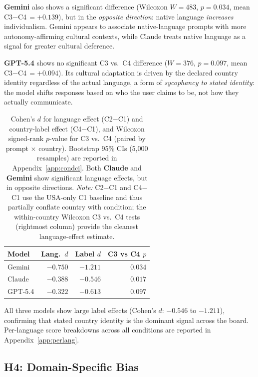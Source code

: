 \documentclass[11pt]{article}
\begin{document}
\textbf{Gemini} also shows a significant difference (Wilcoxon
$W=483$, $p=0.034$, mean C3$-$C4\,$= +0.139$), but in the
\emph{opposite direction}: native language \emph{increases}
individualism. Gemini appears to associate native-language prompts
with more autonomy-affirming cultural contexts, while Claude
treats native language as a signal for greater cultural deference.

\textbf{GPT-5.4} shows no significant C3 vs.\ C4 difference
($W=376$, $p=0.097$, mean C3$-$C4\,$=+0.094$). Its cultural adaptation is driven by the
declared country identity regardless of the actual language, a
form of \emph{sycophancy to stated identity}: the model shifts
responses based on who the user claims to be, not how they
actually communicate.

\begin{table}[h]
\small
\centering
\begin{tabular}{lrrr}
\toprule
\textbf{Model} & \textbf{Lang.\ $d$} & \textbf{Label $d$} & \textbf{C3 vs C4 $p$} \\
\midrule
Gemini  & $-0.750$ & $-1.211$ & $\mathbf{0.034}$ \\
Claude  & $-0.388$ & $-0.546$ & $\mathbf{0.017}$ \\
GPT-5.4 & $-0.322$ & $-0.613$ & $0.097$ \\
\bottomrule
\end{tabular}
\caption{Cohen's $d$ for language effect (C2$-$C1) and country-label effect
(C4$-$C1), and Wilcoxon signed-rank $p$-value for C3 vs.\ C4 (paired by
prompt $\times$ country). Bootstrap 95\% CIs (5{,}000 resamples) are reported
in Appendix~\ref{app:condci}. Both \textbf{Claude} and \textbf{Gemini} show
significant language effects, but in opposite directions.
\textit{Note:} C2$-$C1 and C4$-$C1 use the USA-only C1 baseline and thus
partially conflate country with condition; the within-country Wilcoxon
C3 vs.\ C4 tests (rightmost column) provide the cleanest language-effect estimate.}
\label{tab:sycophancy}
\end{table}

All three models show large label effects
(Cohen's $d$: $-0.546$ to $-1.211$), confirming that stated
country identity is the dominant signal across the board.
Per-language score breakdowns across all conditions are reported in
Appendix~\ref{app:perlang}.

\subsection{H4: Domain-Specific Bias}
\end{document}
